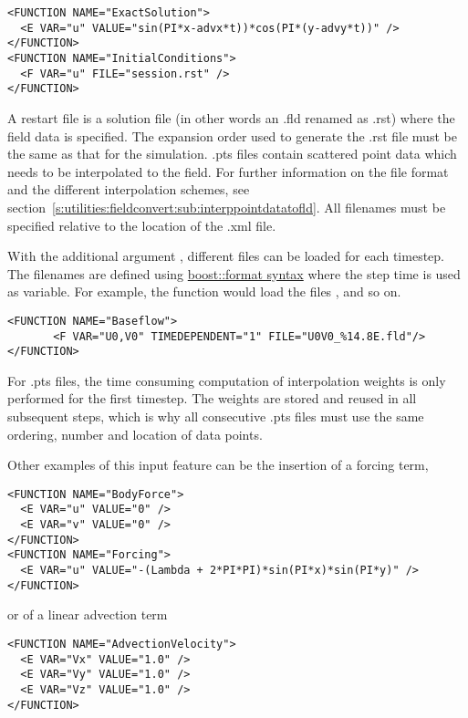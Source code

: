 \begin{lstlisting}[style=XMLStyle]
<FUNCTION NAME="ExactSolution">
  <E VAR="u" VALUE="sin(PI*x-advx*t))*cos(PI*(y-advy*t))" />
</FUNCTION>
<FUNCTION NAME="InitialConditions">
  <F VAR="u" FILE="session.rst" />
</FUNCTION>
\end{lstlisting}

A restart file is a solution file (in other words an .fld renamed as .rst) where
the field data is specified. The expansion order used to generate the .rst file
must be the same as that for the simulation.
.pts files contain scattered point data which needs to be interpolated to the field.
For further information on the file format and the different interpolation schemes, see
section~\ref{s:utilities:fieldconvert:sub:interppointdatatofld}.
All filenames must be specified relative to the location of the .xml file.

With the additional argument , different files can be
loaded for each timestep. The filenames are defined using
\href{http://www.boost.org/doc/libs/1_56_0/libs/format/doc/format.html#syntax}{boost::format syntax}
where the step time is used as variable. For example, the function
 would load the files ,
 and so on.

\begin{lstlisting}[style=XMLStyle]
<FUNCTION NAME="Baseflow">
       <F VAR="U0,V0" TIMEDEPENDENT="1" FILE="U0V0_%14.8E.fld"/>
</FUNCTION>
\end{lstlisting}

For .pts files, the time consuming computation of interpolation weights is only
performed for the first timestep. The weights are stored and reused in all subsequent steps, 
which is why all consecutive .pts files must use the same ordering, number and location of
data points.

Other examples of this input feature can be the insertion of a forcing term,

\begin{lstlisting}[style=XMLStyle]
<FUNCTION NAME="BodyForce">
  <E VAR="u" VALUE="0" />
  <E VAR="v" VALUE="0" />
</FUNCTION>
<FUNCTION NAME="Forcing">
  <E VAR="u" VALUE="-(Lambda + 2*PI*PI)*sin(PI*x)*sin(PI*y)" />
</FUNCTION>
\end{lstlisting}

or of a linear advection term

\begin{lstlisting}[style=XMLStyle]
<FUNCTION NAME="AdvectionVelocity">
  <E VAR="Vx" VALUE="1.0" />
  <E VAR="Vy" VALUE="1.0" />
  <E VAR="Vz" VALUE="1.0" />
</FUNCTION>
\end{lstlisting}

